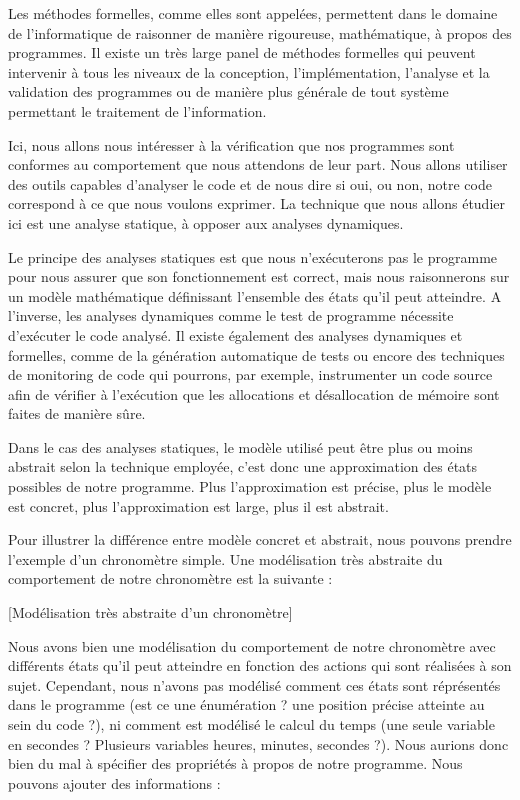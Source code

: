 

Les méthodes formelles, comme elles sont appelées, permettent dans le domaine de 
l'informatique de raisonner de manière rigoureuse, mathématique, à propos des 
programmes. Il existe un très large panel de méthodes formelles qui peuvent 
intervenir à tous les niveaux de la conception, l'implémentation, l'analyse et
la validation des programmes ou de manière plus générale de tout système
permettant le traitement de l'information.



Ici, nous allons nous intéresser à la vérification que nos programmes sont 
conformes au comportement que nous attendons de leur part. Nous allons utiliser 
des outils capables d'analyser le code et de nous dire si oui, ou non, notre 
code correspond à ce que nous voulons exprimer. La technique que nous allons 
étudier ici est une analyse statique, à opposer aux analyses dynamiques.



Le principe des analyses statiques est que nous n'exécuterons pas le programme 
pour nous assurer que son fonctionnement est correct, mais nous raisonnerons sur 
un modèle mathématique définissant l'ensemble des états qu'il peut atteindre.
A l'inverse, les analyses dynamiques comme le test de programme nécessite 
d'exécuter le code analysé. Il existe également des analyses dynamiques et 
formelles, comme de la génération automatique de tests ou encore des techniques de
monitoring de code qui pourrons, par exemple, instrumenter un code source afin de
vérifier à l'exécution que les allocations et désallocation de mémoire sont faites
de manière sûre.



Dans le cas des analyses statiques, le modèle utilisé peut être plus ou moins 
abstrait selon la technique employée, c'est donc une approximation des états 
possibles de notre programme. Plus l'approximation est précise, plus le modèle est
concret, plus l'approximation est large, plus il est abstrait.



Pour illustrer la différence entre modèle concret et abstrait, nous pouvons 
prendre l'exemple d'un chronomètre simple. Une modélisation très abstraite du
comportement de notre chronomètre est la suivante :


[Modélisation très abstraite d'un chronomètre]


Nous avons bien une modélisation du comportement de notre chronomètre avec 
différents états qu'il peut atteindre en fonction des actions qui sont réalisées
à son sujet. Cependant, nous n'avons pas modélisé comment ces états sont 
réprésentés dans le programme (est ce une énumération ? une position précise 
atteinte au sein du code ?), ni comment est modélisé le calcul du temps (une seule
variable en secondes ? Plusieurs variables heures, minutes, secondes ?). Nous 
aurions donc bien du mal à spécifier des propriétés à propos de notre programme. 
Nous pouvons ajouter des informations :




